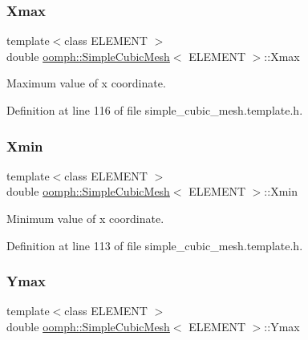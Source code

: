 \subsubsection{\texorpdfstring{Xmax}{Xmax}}
{\footnotesize\ttfamily template$<$class E\+L\+E\+M\+E\+NT $>$ \\
double \hyperlink{classoomph_1_1SimpleCubicMesh}{oomph\+::\+Simple\+Cubic\+Mesh}$<$ E\+L\+E\+M\+E\+NT $>$\+::Xmax\hspace{0.3cm}{\ttfamily [protected]}}



Maximum value of x coordinate. 



Definition at line 116 of file simple\+\_\+cubic\+\_\+mesh.\+template.\+h.

\mbox{\label{classoomph_1_1SimpleCubicMesh_ad04c180e97b51e795d79759916006d0f}} 
\subsubsection{\texorpdfstring{Xmin}{Xmin}}
{\footnotesize\ttfamily template$<$class E\+L\+E\+M\+E\+NT $>$ \\
double \hyperlink{classoomph_1_1SimpleCubicMesh}{oomph\+::\+Simple\+Cubic\+Mesh}$<$ E\+L\+E\+M\+E\+NT $>$\+::Xmin\hspace{0.3cm}{\ttfamily [protected]}}



Minimum value of x coordinate. 



Definition at line 113 of file simple\+\_\+cubic\+\_\+mesh.\+template.\+h.

\mbox{\label{classoomph_1_1SimpleCubicMesh_a7933aa6e3d1755d6a5fbcc2a16af79a7}} 
\subsubsection{\texorpdfstring{Ymax}{Ymax}}
{\footnotesize\ttfamily template$<$class E\+L\+E\+M\+E\+NT $>$ \\
double \hyperlink{classoomph_1_1SimpleCubicMesh}{oomph\+::\+Simple\+Cubic\+Mesh}$<$ E\+L\+E\+M\+E\+NT $>$\+::Ymax\hspace{0.3cm}{\ttfamily [protected]}}



